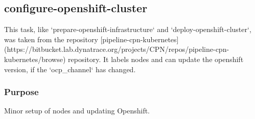 \subsection{configure-openshift-cluster}\label{subsec:configure-openshift-cluster}

This task, like `prepare-openshift-infrastructure` and `deploy-openshift-cluster`, was taken from the repository [pipeline-cpn-kubernetes](https://bitbucket.lab.dynatrace.org/projects/CPN/repos/pipeline-cpn-kubernetes/browse) repository.
It labels nodes and can update the openshift version, if the `{ocp_channel}` has changed.

\subsubsection{Purpose}\label{subsubsec:coc-Purpose}

Minor setup of nodes and updating Openshift.
